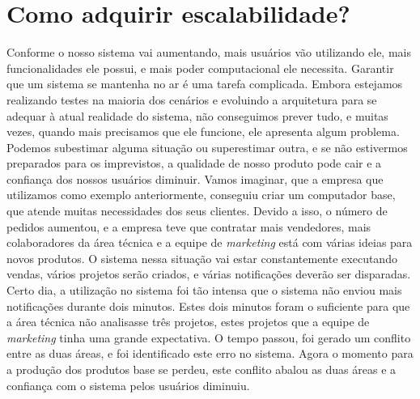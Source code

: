   \chapter{Como adquirir escalabilidade?}
    Conforme o nosso sistema vai aumentando, mais usuários vão utilizando ele,
    mais funcionalidades ele possui, e mais poder computacional ele necessita.
    Garantir que um sistema se mantenha no ar é uma tarefa complicada. Embora
    estejamos realizando testes na maioria dos cenários e evoluindo a arquitetura
    para se adequar à atual realidade do sistema, não conseguimos prever tudo, e
    muitas vezes, quando mais precisamos que ele funcione, ele apresenta algum
    problema. Podemos subestimar alguma situação ou superestimar outra, e se não
    estivermos preparados para os imprevistos, a qualidade de nosso produto pode
    cair e a confiança dos nossos usuários diminuir. \newline
    Vamos imaginar, que a empresa que utilizamos como exemplo anteriormente,
    conseguiu criar um computador base, que atende muitas necessidades dos seus
    clientes. Devido a isso, o número de pedidos aumentou, e a empresa teve que
    contratar mais vendedores, mais colaboradores da área técnica e a equipe de
    \textit{marketing} está com várias ideias para novos produtos. O sistema
    nessa situação vai estar constantemente executando vendas, vários projetos
    serão criados, e várias notificações deverão ser disparadas. Certo dia, a
    utilização no sistema foi tão intensa que o sistema não enviou mais notificações
    durante dois minutos. Estes dois minutos foram o suficiente para que a área
    técnica não analisasse três projetos, estes projetos que a equipe de
    \textit{marketing} tinha uma grande expectativa. O tempo passou, foi gerado
    um conflito entre as duas áreas, e foi identificado este erro no sistema.
    Agora o momento para a produção dos produtos base se perdeu, este conflito
    abalou as duas áreas e a confiança com o sistema pelos usuários diminuiu.

